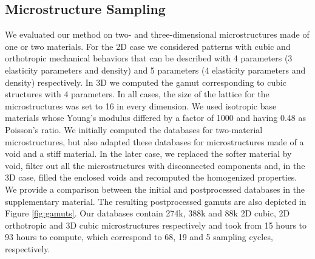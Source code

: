 \subsection{Microstructure Sampling}
We evaluated our method on two- and three-dimensional microstructures made of one or two materials. For the 2D case we considered patterns with cubic and orthotropic mechanical behaviors that can be described with 4 parameters (3 elasticity parameters and density) and 5 parameters (4 elasticity parameters and density) respectively. In 3D we computed the gamut corresponding to cubic structures with 4 parameters. In all cases, the size of the lattice for the microstructures was set to 16 in every dimension. We used isotropic base materials whose Young's modulus differed by a factor of 1000 and having 0.48 as Poisson's ratio. We initially computed the databases for two-material microstructures, but also adapted these databases for microstructures made of a void and a stiff material. In the later case, we replaced the softer material by void, filter out all the microstructures with disconnected components and, in the 3D case, filled the enclosed voids and recomputed the homogenized properties. We provide a comparison between the initial and postprocessed databases in the supplementary material. The resulting postprocessed gamuts are also depicted in Figure \ref{fig:gamuts}. 
Our databases contain 274k, 388k and 88k 2D cubic, 2D orthotropic and 3D cubic microstructures respectively and took from 15 hours to 93 hours to compute, which correspond to 68, 19 and 5 sampling cycles, respectively.
